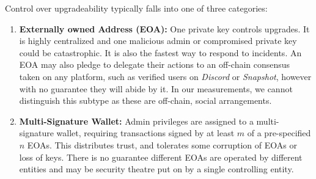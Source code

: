 Control over upgradeability typically falls into one of three categories: 


\begin{enumerate}
\item \textbf{Externally owned Address (EOA):}
One private key controls upgrades. It is highly centralized and one malicious admin or compromised private key could be catastrophic. It is also the fastest way to respond to incidents. An EOA may also pledge to delegate their actions to an off-chain consensus taken on any platform, such as verified users on \textit{Discord} or \textit{Snapshot}, however with no guarantee they will abide by it. In our measurements, we cannot distinguish this subtype as these are off-chain, social arrangements. 

\item \textbf{Multi-Signature Wallet:}
Admin privileges are assigned to a multi-signature wallet, requiring transactions signed by at least $m$ of a pre-specified $n$ EOAs.   This distributes trust, and tolerates some corruption of EOAs or loss of keys. There is no guarantee different EOAs are operated by different entities and may be security theatre put on by a single controlling entity.



\end{enumerate}
